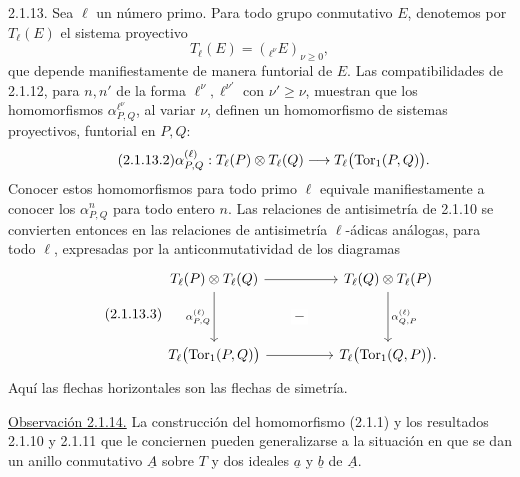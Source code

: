 
2.1.13. Sea $\ell$ un número primo. Para todo grupo conmutativo $E$,
denotemos por $T_\ell(E)$ el sistema proyectivo
\begin{equation}\tag{2.1.13.1}
 T_\ell(E)=({}_{\ell^\nu}E)_{\nu\geq0},
\end{equation}
que depende manifiestamente de manera funtorial de $E$. Las
compatibilidades de 2.1.12, para $n,n'$ de la forma
$\ell^\nu,\ell^{\nu'}$ con $\nu'\geq\nu$, muestran que los
homomorfismos $\alpha^{\ell^\nu}_{P,Q}$, al variar $\nu$, definen un
homomorfismo de sistemas proyectivos, funtorial en $P,Q$:
\begin{equation}\tag{2.1.13.2}
 \alpha^{(\ell)}_{P,Q}:
 T_\ell(P)\otimes T_\ell(Q)
 \longrightarrow T_\ell\bigl(\operatorname{Tor}_1(P,Q)\bigr).
\end{equation}
Conocer estos homomorfismos para todo primo $\ell$ equivale
manifiestamente a conocer los $\alpha^n_{P,Q}$ para todo entero $n$.
Las relaciones de antisimetría de 2.1.10 se convierten entonces en las
relaciones de antisimetría $\ell$-ádicas análogas, para todo $\ell$,
expresadas por la anticonmutatividad de los diagramas
\begin{equation}\tag{2.1.13.3}
\begin{tikzcd}[column sep=huge,row sep=huge]
 T_\ell(P)\otimes T_\ell(Q)
   \arrow[r]
   \arrow[d,"{\alpha^{(\ell)}_{P,Q}}"']
   \arrow[rd,phantom,"-" description]&
 T_\ell(Q)\otimes T_\ell(P)
   \arrow[d,"{\alpha^{(\ell)}_{Q,P}}"]\\
 T_\ell\bigl(\uTor_1(P,Q)\bigr)
   \arrow[r]&
 T_\ell\bigl(\uTor_1(Q,P)\bigr).
\end{tikzcd}
\end{equation}
Aquí las flechas horizontales son las flechas de simetría.

\medskip
\noindent\underline{Observación 2.1.14.}
La construcción del homomorfismo (2.1.1) y los resultados 2.1.10 y
2.1.11 que le conciernen pueden generalizarse a la situación en que
se dan un anillo conmutativo $\underline A$ sobre $T$ y dos ideales
$\underline a$ y $\underline b$ de $\underline A$.


